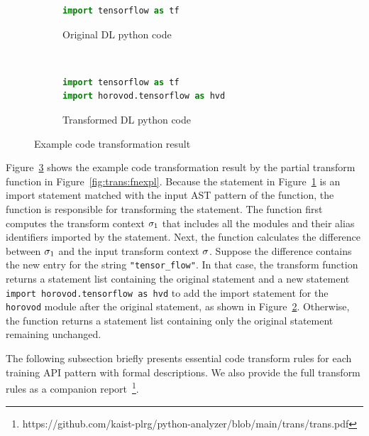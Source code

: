 \begin{figure}[ht!]
    \centering
    \begin{subfigure}[b]{0.48\textwidth}
        \begin{lstlisting}[language=Python]
import tensorflow as tf\end{lstlisting}
        \caption{Original DL python code}
        \label{fig:trans:ex01:org}
    \end{subfigure}
    ~
    \begin{subfigure}[b]{0.48\textwidth}
        \begin{lstlisting}[language=Python]
import tensorflow as tf
import horovod.tensorflow as hvd\end{lstlisting}
        \caption{Transformed DL python code}
        \label{fig:trans:ex01:hvd}
    \end{subfigure}
    \caption{Example code transformation result}
    \label{fig:trans:ex01}
\end{figure}

Figure~\ref{fig:trans:ex01} shows the example code transformation result by the
partial transform function in Figure~\ref{fig:trans:fnexpl}.
Because the statement in Figure~\ref{fig:trans:ex01:org} is an import statement
matched with the input AST pattern of the function, the function is responsible
for transforming the statement.
The function first computes the transform context $\sigma_{1}$ that
includes all the modules and their alias identifiers imported by the statement.
Next, the function calculates the difference between $\sigma_{1}$ and the
input transform context $\sigma$.
Suppose the difference contains the new entry for the string {\tt "tensor\_flow"}.
In that case, the transform function returns a statement list containing the
original statement and a new statement {\tt import horovod.tensorflow as hvd}
to add the import statement for the {\tt horovod} module after the original
statement, as shown in Figure~\ref{fig:trans:ex01:hvd}.  
Otherwise, the function returns a statement list containing only the original
statement remaining unchanged.

The following subsection briefly presents essential code transform rules for
each training API pattern with formal descriptions. 
We also provide the full transform rules as a companion
report~\footnote{https://github.com/kaist-plrg/python-analyzer/blob/main/trans/trans.pdf}.

